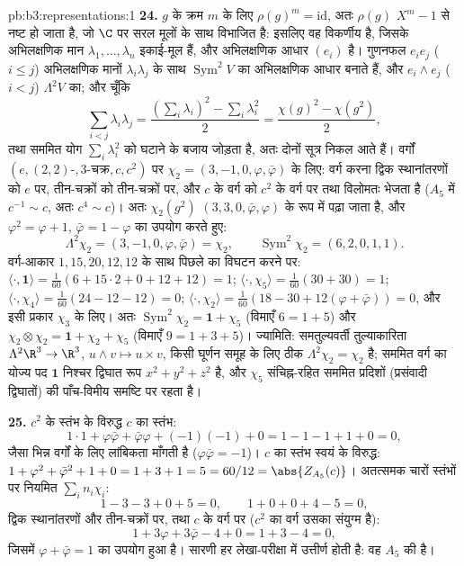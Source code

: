 \begin{solution}{pb:b3:representations:1}
\textbf{24.} $g$ के क्रम $m$ के लिए $\rho(g)^m = \mathrm{id}$, अतः $\rho(g)$ $X^m - 1$ से
नष्ट हो जाता है, जो $\C$ पर सरल मूलों के साथ विभाजित है: इसलिए वह
विकर्णीय है, जिसके अभिलक्षणिक मान $\lambda_1, \dots, \lambda_n$ इकाई-मूल हैं, और अभिलक्षणिक
आधार $(e_i)$ है। गुणनफल $e_ie_j$ ($i \leq j$) अभिलक्षणिक मानों $\lambda_i\lambda_j$ के साथ
$\operatorname{Sym}^2V$ का अभिलक्षणिक आधार बनाते हैं, और $e_i \wedge e_j$ ($i < j$) $\Lambda^2V$ का; और
चूँकि
\[
\sum_{i<j}\lambda_i\lambda_j
= \frac{(\sum_i\lambda_i)^2 - \sum_i\lambda_i^2}2
= \frac{\chi(g)^2 - \chi(g^2)}2,
\]
तथा सममित योग $\sum_i\lambda_i^2$ को घटाने के बजाय जोड़ता है, अतः दोनों सूत्र
निकल आते हैं। वर्गों $(e, (2,2)\text{-},
3\text{-चक्र}, c, c^2)$ पर $\chi_2 = (3, -1,
0, \varphi, \bar\varphi)$ के लिए: वर्ग करना द्विक स्थानांतरणों
को $e$ पर, तीन-चक्रों को तीन-चक्रों पर, और $c$ के वर्ग को $c^2$
के वर्ग पर तथा विलोमतः भेजता है ($A_5$ में $c^{-1} \sim
c$, अतः $c^4 \sim c$)। अतः
$\chi_2(g^2)$ $(3,
3, 0, \bar\varphi, \varphi)$ के रूप में पढ़ा जाता है, और $\varphi^2 = \varphi
+ 1$, $\bar\varphi = 1 - \varphi$ का उपयोग करते
हुए:
\[
\Lambda^2\chi_2 = (3, -1, 0, \varphi, \bar\varphi) = \chi_2,
\qquad
\operatorname{Sym}^2\chi_2 = (6, 2, 0, 1, 1) .
\]
वर्ग-आकार $1, 15, 20, 12,
12$ के साथ पिछले का विघटन करने पर: $\langle\cdot, \mathbf 1\rangle = \frac1{60}(6 +
15\cdot2 + 0 + 12 + 12) = 1$; $\langle\cdot, \chi_5\rangle =
\frac1{60}(30 + 30) = 1$; $\langle\cdot, \chi_4\rangle =
\frac1{60}(24 - 12 - 12) = 0$;
$\langle\cdot, \chi_2\rangle =
\frac1{60}(18 - 30 + 12(\varphi + \bar\varphi)) = 0$, और इसी प्रकार $\chi_3$ के लिए। अतः $\operatorname{Sym}^2\chi_2 =
\mathbf 1 + \chi_5$ (विमाएँ $6 = 1 + 5$) और
$\chi_2\otimes\chi_2 = \mathbf 1 + \chi_2 + \chi_5$
(विमाएँ $9 = 1 + 3 + 5$)। ज्यामिति: समतुल्यवर्ती तुल्याकारिता $\Lambda^2\R^3 \to \R^3$, $u \wedge v \mapsto u
\times v$,
किसी घूर्णन समूह के लिए ठीक $\Lambda^2\chi_2 = \chi_2$ है; सममित वर्ग का योज्य पद $\mathbf 1$
निश्चर द्विघात रूप $x^2 + y^2 + z^2$ है, और $\chi_5$ संचिह्न-रहित सममित प्रदिशों
(प्रसंवादी द्विघातों) की पाँच-विमीय समष्टि पर रहता है।

\textbf{25.} $c^2$ के स्तंभ के विरुद्ध $c$ का स्तंभ:
\[
1\cdot1 + \varphi\bar\varphi + \bar\varphi\varphi +
(-1)(-1) + 0 = 1 - 1 - 1 + 1 + 0 = 0,
\]
जैसा भिन्न वर्गों के लिए लांबिकता माँगती है ($\varphi
\bar\varphi = -1$)। $c$ का स्तंभ
स्वयं के विरुद्ध: $1 +
\varphi^2 + \bar\varphi^2 + 1 + 0 = 1 + 3 + 1 = 5 = 60/12 =
\abs{Z_{A_5}(c)}$। अतत्समक चारों स्तंभों पर नियमित  $\sum_in_i\chi_i$:
\[
1 - 3 - 3 + 0 + 5 = 0, \qquad
1 + 0 + 0 + 4 - 5 = 0,
\]
द्विक स्थानांतरणों और तीन-चक्रों पर, तथा $c$ के वर्ग पर ($c^2$
का वर्ग उसका  संयुग्म है):
\[
1 + 3\varphi + 3\bar\varphi - 4 + 0 = 1 + 3 - 4 = 0,
\]
जिसमें $\varphi + \bar\varphi = 1$ का उपयोग हुआ है। सारणी हर लेखा-परीक्षा में उत्तीर्ण
होती है: वह $A_5$ की  है।
\end{solution}
